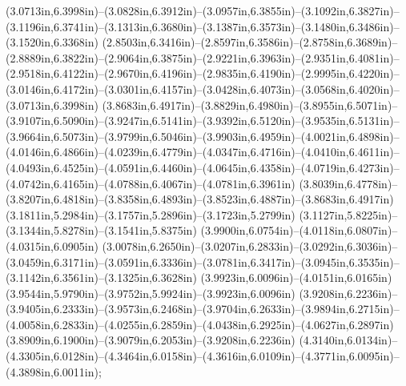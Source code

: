 (3.0713in,6.3998in)--(3.0828in,6.3912in)--(3.0957in,6.3855in)--(3.1092in,6.3827in)--(3.1196in,6.3741in)--(3.1313in,6.3680in)--(3.1387in,6.3573in)--(3.1480in,6.3486in)--(3.1520in,6.3368in) (2.8503in,6.3416in)--(2.8597in,6.3586in)--(2.8758in,6.3689in)--(2.8889in,6.3822in)--(2.9064in,6.3875in)--(2.9221in,6.3963in)--(2.9351in,6.4081in)--(2.9518in,6.4122in)--(2.9670in,6.4196in)--(2.9835in,6.4190in)--(2.9995in,6.4220in)--(3.0146in,6.4172in)--(3.0301in,6.4157in)--(3.0428in,6.4073in)--(3.0568in,6.4020in)--(3.0713in,6.3998in) (3.8683in,6.4917in)--(3.8829in,6.4980in)--(3.8955in,6.5071in)--(3.9107in,6.5090in)--(3.9247in,6.5141in)--(3.9392in,6.5120in)--(3.9535in,6.5131in)--(3.9664in,6.5073in)--(3.9799in,6.5046in)--(3.9903in,6.4959in)--(4.0021in,6.4898in)--(4.0146in,6.4866in)--(4.0239in,6.4779in)--(4.0347in,6.4716in)--(4.0410in,6.4611in)--(4.0493in,6.4525in)--(4.0591in,6.4460in)--(4.0645in,6.4358in)--(4.0719in,6.4273in)--(4.0742in,6.4165in)--(4.0788in,6.4067in)--(4.0781in,6.3961in) (3.8039in,6.4778in)--(3.8207in,6.4818in)--(3.8358in,6.4893in)--(3.8523in,6.4887in)--(3.8683in,6.4917in) (3.1811in,5.2984in)--(3.1757in,5.2896in)--(3.1723in,5.2799in) (3.1127in,5.8225in)--(3.1344in,5.8278in)--(3.1541in,5.8375in) (3.9900in,6.0754in)--(4.0118in,6.0807in)--(4.0315in,6.0905in) (3.0078in,6.2650in)--(3.0207in,6.2833in)--(3.0292in,6.3036in)--(3.0459in,6.3171in)--(3.0591in,6.3336in)--(3.0781in,6.3417in)--(3.0945in,6.3535in)--(3.1142in,6.3561in)--(3.1325in,6.3628in) (3.9923in,6.0096in)--(4.0151in,6.0165in) (3.9544in,5.9790in)--(3.9752in,5.9924in)--(3.9923in,6.0096in) (3.9208in,6.2236in)--(3.9405in,6.2333in)--(3.9573in,6.2468in)--(3.9704in,6.2633in)--(3.9894in,6.2715in)--(4.0058in,6.2833in)--(4.0255in,6.2859in)--(4.0438in,6.2925in)--(4.0627in,6.2897in) (3.8909in,6.1900in)--(3.9079in,6.2053in)--(3.9208in,6.2236in) (4.3140in,6.0134in)--(4.3305in,6.0128in)--(4.3464in,6.0158in)--(4.3616in,6.0109in)--(4.3771in,6.0095in)--(4.3898in,6.0011in);
